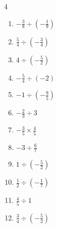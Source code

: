 \begin{multicols}{4}
\begin{enumerate}
  \item $\displaystyle -\frac{3}{8}\div{}\left(-\frac{1}{9}\right)$


  \item $\displaystyle \frac{5}{4}\div{}\left(-\frac{3}{4}\right)$


  \item $\displaystyle 4\div{}\left(-\frac{5}{2}\right)$


  \item $\displaystyle -\frac{5}{4}\div{}\left(-2\right)$


  \item $\displaystyle -1\div{}\left(-\frac{9}{5}\right)$


  \item $\displaystyle -\frac{2}{3}\div{}3$


  \item $\displaystyle -\frac{3}{5}\times{}\frac{4}{5}$


  \item $\displaystyle -3\div{}\frac{6}{7}$


  \item $\displaystyle 1\div{}\left(-\frac{5}{2}\right)$


  \item $\displaystyle \frac{1}{2}\div{}\left(-\frac{1}{7}\right)$


\columnbreak %

  \item $\displaystyle \frac{4}{5}\div{}1$


  \item $\displaystyle \frac{3}{4}\div{}\left(-\frac{5}{2}\right)$


\end{enumerate}
\end{multicols}
